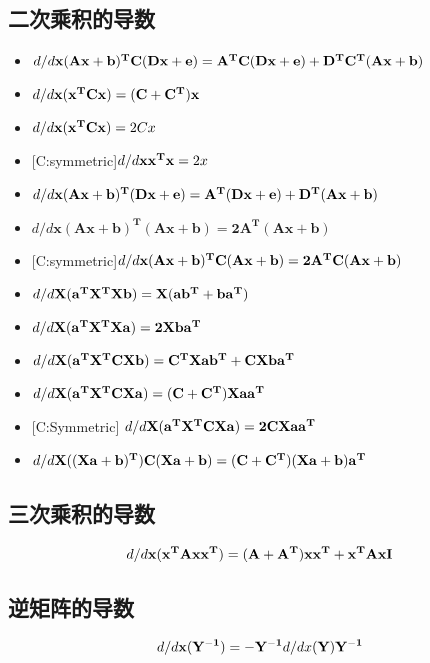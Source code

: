 \documentclass[fontset=none,oneside]{book}
\begin{document}
\subsection{二次乘积的导数}
\begin{itemize}
\item $d/d{\bf x}{\bf (Ax+b)^TC(Dx+e)}={\bf A^TC(Dx+e)+D^TC^T(Ax+b)}$
\item $d/d{\bf x}{\bf(x^TCx)}={\bf (C+C^T)x}$
\item $d/d{\bf x}{\bf(x^TCx)}=2Cx$
\item {\color{red} [C:symmetric]}$d/d{\bf x}{\bf x^Tx}=2x$
\item $d/d{\bf x}{\bf (Ax+b)^T(Dx+e)}={\bf A^T(Dx+e)+D^T(Ax+b)}$
\item $d/d{\mathbf{x}}\mathbf{(Ax+b)^T(Ax+b)=2A^T(Ax+b)}$
\item {\color{red}[C:symmetric]}$d/d{\bf x}\mathbf{(Ax+b)^TC(Ax+b)=2A^TC(Ax+b)}$
\item $d/d{\bf X}\mathbf{(a^TX^TXb)=X(ab^T+ba^T)}$
\item $d/d{\bf X}\mathbf{(a^TX^TXa)=2Xba^T}$
\item $d/d{\bf X}\mathbf{(a^TX^TCXb)=C^TXab^T+CXba^T}$
\item $d/d{\bf X}\mathbf{(a^TX^TCXa)=(C+C^T)Xaa^T}$
\item {\color{red} [C:Symmetric]} $d/d{\bf X}\mathbf{(a^TX^TCXa)=2CXaa^T}$
\item $d/d{\bf X}\mathbf{((Xa+b)^T)C(Xa+b)=(C+C^T)(Xa+b)a^T}$
\end{itemize}
\subsection{三次乘积的导数}
\begin{equation}
d/d{\bf x}\mathbf{(x^TAxx^T)=(A+A^T)xx^T+x^TAxI}
\end{equation}
\subsection{逆矩阵的导数}
\begin{equation}
d/d{\bf x}\mathbf{(Y^{-1})=-Y^{-1}}d/dx\mathbf{(Y)Y^{-1}}
\end{equation}
\end{document}
